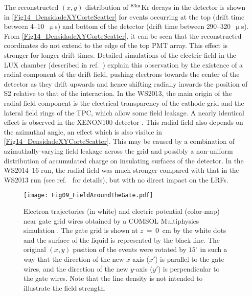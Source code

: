 \documentclass[a4paper,11pt]{article}
\begin{document}
The reconstructed $(x, y)$ distribution of ${}^{{\rm 83m}}$Kr decays in the detector is shown in \cref{Fig14_DensidadeXYCorteScatter} for  events occurring at the top (drift time between 4--10~$\upmu$s) and bottom of the detector (drift time between 290--320~$\upmu$s). From \cref{Fig14_DensidadeXYCorteScatter}, it can be seen that  the reconstructed coordinates do not extend to the edge of the top PMT array. This effect is stronger for longer drift times. Detailed simulations of the electric field in the LUX chamber (described in ref.\ \cite{Fields2017}) explain this observation by the existence of a radial component of the drift field, pushing electrons towards the center of the detector as they drift upwards and hence shifting radially inwards the position of S2 relative to that of the interaction.  In the WS2013, the main origin of the radial field component is the electrical transparency of the cathode grid and  the lateral field rings of the TPC, which allow some field leakage. A nearly identical effect is observed in the XENON100 detector \cite{XENON100_thesis}. This radial field also depends on the azimuthal angle, an effect which is also visible in \cref{Fig14_DensidadeXYCorteScatter}. This may be caused by a combination of azimuthally-varying field leakage across the grid and possibly a non-uniform distribution of accumulated charge on insulating surfaces of the detector. In the WS2014--16 run, the radial field was much stronger  compared with that in the WS2013 run (see ref.\ \cite{Fields2017} for details), but with no direct impact on the LRFs.
 

\begin{figure}
 \begin{center}
   \texttt{[image: Fig09\_FieldAroundTheGate.pdf]}	
\caption{Electron trajectories (in white) and electric potential (color-map) near gate grid wires obtained by a COMSOL Multiphysics simulation \cite{Fields2017}. The gate grid is shown at $z$~=~0~cm by the white dots and the surface of the liquid is represented by the black line. The original $(x, y)$ position of the events were rotated by $15^{\circ}$ in such a way that the direction of the new $x$-axis ($x'$) is parallel to the gate wires, and the direction of the new $y$-axis ($y'$) is perpendicular to the gate wires. Note that the line density is not intended to illustrate the field strength.}
  \label{Fig17_FieldAroundTheGate}
 \end{center}
\end{figure}
\end{document}
